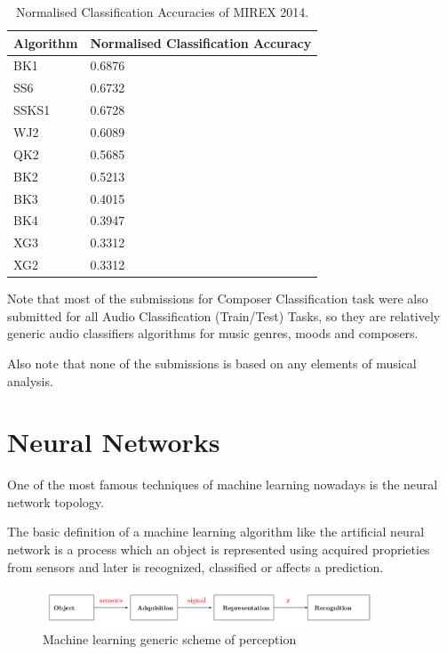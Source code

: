 \documentclass[a4paper,openany,oneside,12pt]{book}
\begin{document}
\begin{table}
\centering
   \begin{tabular}{ | l || l | }
   \hline
   Algorithm & Normalised Classification Accuracy \\ \hline
   BK1 & 0.6876 \\ \hline
   SS6 & 0.6732 \\ \hline
   SSKS1 & 0.6728 \\ \hline
   WJ2 & 0.6089 \\ \hline
   QK2 & 0.5685 \\ \hline
   BK2 & 0.5213 \\ \hline
   BK3 & 0.4015 \\ \hline
   BK4 & 0.3947 \\ \hline
   XG3 & 0.3312 \\ \hline
   XG2 & 0.3312 \\ \hline
   \end{tabular}

\caption{Normalised Classification Accuracies of MIREX 2014.\cite{resultsMirex14}} \label{fig:MIREX14results}
\end{table}

Note that most of the submissions for Composer Classification task were also submitted for all Audio Classification (Train/Test) Tasks, so they are relatively generic audio classifiers algorithms for music genres, moods and composers.

Also note that none of the submissions is based on any elements of musical analysis.

\section{Neural Networks}


One of the most famous techniques of machine learning nowadays is the neural network topology.

The basic definition of a machine learning algorithm like the artificial neural network is a process which an object is represented using acquired proprieties from sensors and later is recognized, classified or affects a prediction.

\begin{figure}
\centering
\includegraphics[width=0.9\textwidth]{img/machinelearning.png} 
\caption{Machine learning generic scheme of perception\cite{rparedesNN}} \label{fig:machinelearning}
\end{figure}
\end{document}
